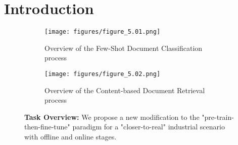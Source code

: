 \documentclass[preprint,review,12pt]{elsarticle}
\begin{document}
\section{Introduction}
\label{sec:intro}
\begin{figure}[t]
\centering
\begin{subfigure}{.90\textwidth}
  \texttt{[image: figures/figure\_5.01.png]} \quad
  \caption{Overview of the Few-Shot Document Classification process}
  \label{fig:fewshot_document_classification}
\end{subfigure}\hfill
\begin{subfigure}{.90\textwidth}
  \texttt{[image: figures/figure\_5.02.png]} \quad
  \caption{Overview of the Content-based Document Retrieval process}
  \label{fig:document_retrieval}
\end{subfigure}
\caption{\textbf{Task Overview:} We propose a new modification to the "pre-train-then-fine-tune" paradigm for a "closer-to-real" industrial scenario with offline and online stages.}
\label{fig:industrial_data_paradox}
\end{figure}
\end{document}
